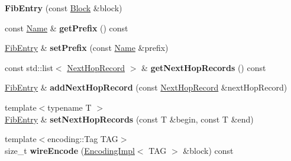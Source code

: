 \begin{DoxyCompactItemize}
\item 
{\bfseries Fib\+Entry} (const \hyperlink{classndn_1_1Block}{Block} \&block)\hypertarget{classndn_1_1nfd_1_1FibEntry_ad56706c0128607ae856c57544211cc3b}{}\label{classndn_1_1nfd_1_1FibEntry_ad56706c0128607ae856c57544211cc3b}

\item 
const \hyperlink{classndn_1_1Name}{Name} \& {\bfseries get\+Prefix} () const\hypertarget{classndn_1_1nfd_1_1FibEntry_a8072cad04a2950195fbf710a7033d5d9}{}\label{classndn_1_1nfd_1_1FibEntry_a8072cad04a2950195fbf710a7033d5d9}

\item 
\hyperlink{classndn_1_1nfd_1_1FibEntry}{Fib\+Entry} \& {\bfseries set\+Prefix} (const \hyperlink{classndn_1_1Name}{Name} \&prefix)\hypertarget{classndn_1_1nfd_1_1FibEntry_a56d61080caf53947ac9250d09c673eb5}{}\label{classndn_1_1nfd_1_1FibEntry_a56d61080caf53947ac9250d09c673eb5}

\item 
const std\+::list$<$ \hyperlink{classndn_1_1nfd_1_1NextHopRecord}{Next\+Hop\+Record} $>$ \& {\bfseries get\+Next\+Hop\+Records} () const\hypertarget{classndn_1_1nfd_1_1FibEntry_a2c4228160e9d69d3435d3a0341b75b2a}{}\label{classndn_1_1nfd_1_1FibEntry_a2c4228160e9d69d3435d3a0341b75b2a}

\item 
\hyperlink{classndn_1_1nfd_1_1FibEntry}{Fib\+Entry} \& {\bfseries add\+Next\+Hop\+Record} (const \hyperlink{classndn_1_1nfd_1_1NextHopRecord}{Next\+Hop\+Record} \&next\+Hop\+Record)\hypertarget{classndn_1_1nfd_1_1FibEntry_a5cab67d0c53d0b1d9e970bfa12bd1043}{}\label{classndn_1_1nfd_1_1FibEntry_a5cab67d0c53d0b1d9e970bfa12bd1043}

\item 
{\footnotesize template$<$typename T $>$ }\\\hyperlink{classndn_1_1nfd_1_1FibEntry}{Fib\+Entry} \& {\bfseries set\+Next\+Hop\+Records} (const T \&begin, const T \&end)\hypertarget{classndn_1_1nfd_1_1FibEntry_a7f188ca545a63127a256645f116c2e26}{}\label{classndn_1_1nfd_1_1FibEntry_a7f188ca545a63127a256645f116c2e26}

\item 
{\footnotesize template$<$encoding\+::\+Tag T\+AG$>$ }\\size\+\_\+t {\bfseries wire\+Encode} (\hyperlink{classndn_1_1encoding_1_1EncodingImpl}{Encoding\+Impl}$<$ T\+AG $>$ \&block) const\hypertarget{classndn_1_1nfd_1_1FibEntry_a6fbf459f6415568f6c0f1254292e4774}{}\label{classndn_1_1nfd_1_1FibEntry_a6fbf459f6415568f6c0f1254292e4774}


\end{DoxyCompactItemize}
